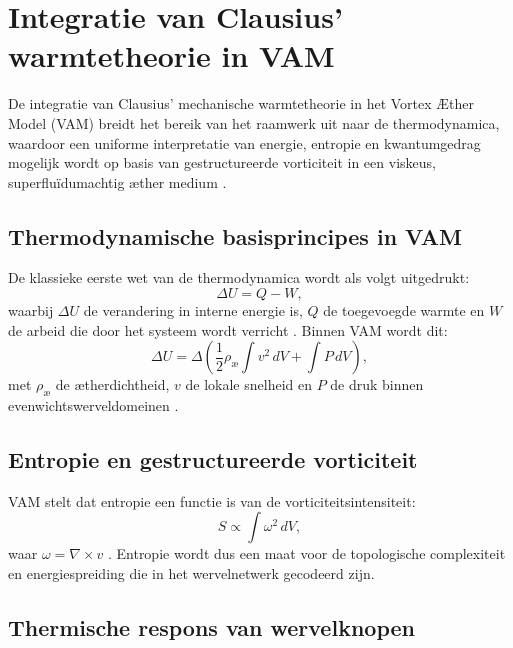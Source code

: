 \section{Integratie van Clausius' warmtetheorie in VAM}\label{sec:appendix_8}

De integratie van Clausius' mechanische warmtetheorie in het Vortex Æther Model (VAM) breidt het bereik van het raamwerk uit naar de thermodynamica,
waardoor een uniforme interpretatie van energie, entropie en kwantumgedrag mogelijk wordt op basis van gestructureerde vorticiteit in een viskeus, superfluïdumachtig æther
medium \cite{clausius1865mechanical,maxwell1865elektromagnetisch,helmholtz1858integralen}.

\subsection{Thermodynamische basisprincipes in VAM}

De klassieke eerste wet van de thermodynamica wordt als volgt uitgedrukt:
\begin{equation}
\Delta U = Q - W,\label{eq:first_law_thermodynamics}
\end{equation}
waarbij $\Delta U$ de verandering in interne energie is, $Q$ de toegevoegde warmte en $W$ de arbeid die door het systeem wordt verricht \cite{clausius1865mechanical}. Binnen VAM wordt dit:
\begin{equation}
\Delta U = \Delta \left( \frac{1}{2} \rho_\text{\ae} \int v^2 \, dV + \int P \, dV \right),\label{eq:first_law_vam}
\end{equation}
met $\rho_\text{\ae}$ de ætherdichtheid, $v$ de lokale snelheid en $P$ de druk binnen evenwichtswerveldomeinen \cite{vam2025unified}.

\subsection{Entropie en gestructureerde vorticiteit}

VAM stelt dat entropie een functie is van de vorticiteitsintensiteit:
\begin{equation}
S \propto \int \omega^2 \, dV,\label{eq:entropy_vorticity}
\end{equation}
waar $\omega = \nabla \times v$ \cite{kelvin1867vortex}. Entropie wordt dus een maat voor de topologische complexiteit en energiespreiding die in het wervelnetwerk gecodeerd zijn.

\subsection{Thermische respons van wervelknopen}

